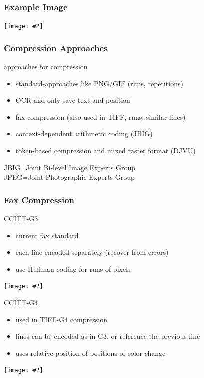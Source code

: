 \documentclass{beamer}
\newcommand{\igc}[2]{\centerline{\texttt{[image: \#2]}}}
\begin{document}
\begin{frame}
  \frametitle{Example Image}

\igc{0.99}{nederl}

\end{frame}

\begin{frame}
  \frametitle{Compression Approaches}

approaches for compression
  \begin{itemize}
  \item standard-approaches like PNG/GIF (runs, repetitions)
  \item OCR and only save text and position 
  \item fax compression (also used in TIFF, runs, similar lines)
  \item context-dependent arithmetic coding (JBIG)
  \item token-based compression and mixed raster format (DJVU)
  \end{itemize}

JBIG=Joint Bi-level Image Experts Group\\
JPEG=Joint Photographic Experts Group

\end{frame}

\begin{frame}
  \frametitle{Fax Compression}

CCITT-G3 
\begin{itemize}
\item current fax standard
\item each line encoded separately (recover from errors)
\item use Huffman coding for runs of pixels
\end{itemize}

\igc{0.4}{ccitt1}

CCITT-G4
\begin{itemize}
\item used in TIFF-G4 compression
\item lines can be encoded as in G3, or reference the previous line 
\item uses relative position of positions of color change
\end{itemize}

\igc{0.6}{ccitt3}


\end{frame}
\end{document}
